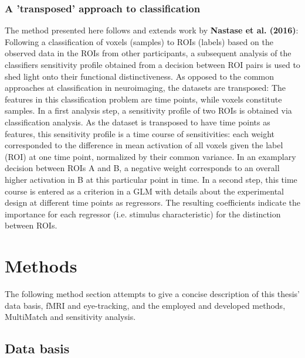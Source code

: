 \documentclass[a4paper, 12pt]{scrreprt}
\begin{document}
\subsection{A 'transposed' approach to classification}
The method presented here follows and extends work by \textbf{Nastase et al. (2016)}: Following a classification of voxels (samples) to ROIs (labels) based on the observed data in the ROIs from other participants, a subsequent analysis of the classifiers sensitivity profile obtained from a decision between ROI pairs is used to shed light onto their functional distinctiveness. As opposed to the common approaches at classification in neuroimaging, the datasets are transposed: The features in this classification problem are time points, while voxels constitute samples. \newline
In a first analysis step, a sensitivity profile of two ROIs is obtained via classification analysis. As the dataset is transposed to have time points as features, this sensitivity profile is a time course of sensitivities: each weight corresponded to the difference in mean activation of all voxels given the label (ROI) at one time point, normalized by their common variance. In an examplary decision between ROIs A and B, a negative weight corresponds to an overall higher activation in B at this particular point in time. In a second step, this time course is entered as a criterion in a GLM with details about the experimental design at different time points as regressors. The resulting coefficients indicate the importance for each regressor (i.e. stimulus characteristic) for the distinction between ROIs.


\chapter{Methods}\label{section:methods}

The following method section attempts to give a concise description of this thesis' data basis, fMRI and eye-tracking, and the employed and developed methods, MultiMatch and sensitivity analysis. 

\section{Data basis}
\end{document}
